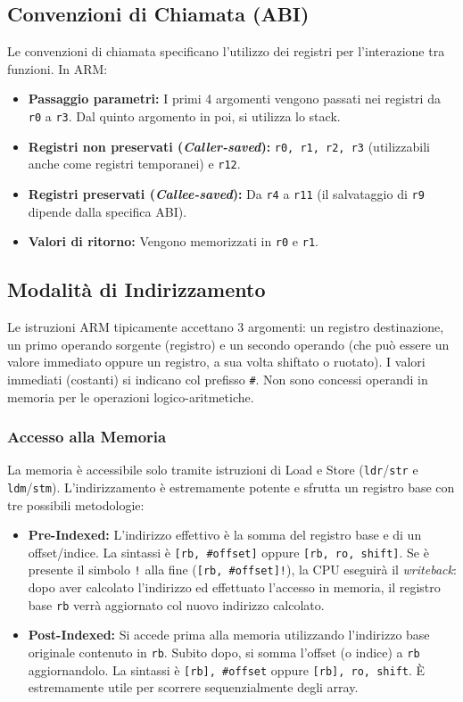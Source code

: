 \documentclass[12pt, a4paper]{article}
\begin{document}
\subsection{Convenzioni di Chiamata (ABI)}
Le convenzioni di chiamata specificano l'utilizzo dei registri per l'interazione tra funzioni. In ARM:
\begin{itemize}
    \item \textbf{Passaggio parametri:} I primi 4 argomenti vengono passati nei registri da \texttt{r0} a \texttt{r3}. Dal quinto argomento in poi, si utilizza lo stack.
    \item \textbf{Registri non preservati (\textit{Caller-saved}):} \texttt{r0, r1, r2, r3} (utilizzabili anche come registri temporanei) e \texttt{r12}.
    \item \textbf{Registri preservati (\textit{Callee-saved}):} Da \texttt{r4} a \texttt{r11} (il salvataggio di \texttt{r9} dipende dalla specifica ABI).
    \item \textbf{Valori di ritorno:} Vengono memorizzati in \texttt{r0} e \texttt{r1}.
\end{itemize}

\subsection{Modalità di Indirizzamento}
Le istruzioni ARM tipicamente accettano 3 argomenti: un registro destinazione, un primo operando sorgente (registro) e un secondo operando (che può essere un valore immediato oppure un registro, a sua volta shiftato o ruotato). I valori immediati (costanti) si indicano col prefisso \texttt{\#}. Non sono concessi operandi in memoria per le operazioni logico-aritmetiche.

\subsubsection{Accesso alla Memoria}
La memoria è accessibile solo tramite istruzioni di Load e Store (\texttt{ldr}/\texttt{str} e \texttt{ldm}/\texttt{stm}). L'indirizzamento è estremamente potente e sfrutta un registro base con tre possibili metodologie:
\begin{itemize}
    \item \textbf{Pre-Indexed:} L'indirizzo effettivo è la somma del registro base e di un offset/indice. La sintassi è \texttt{[rb, \#offset]} oppure \texttt{[rb, ro, shift]}. 
    Se è presente il simbolo \texttt{!} alla fine (\texttt{[rb, \#offset]!}), la CPU eseguirà il \textit{writeback}: dopo aver calcolato l'indirizzo ed effettuato l'accesso in memoria, il registro base \texttt{rb} verrà aggiornato col nuovo indirizzo calcolato.
    \item \textbf{Post-Indexed:} Si accede prima alla memoria utilizzando l'indirizzo base originale contenuto in \texttt{rb}. Subito dopo, si somma l'offset (o indice) a \texttt{rb} aggiornandolo. La sintassi è \texttt{[rb], \#offset} oppure \texttt{[rb], ro, shift}. È estremamente utile per scorrere sequenzialmente degli array.
\end{itemize}
\end{document}
